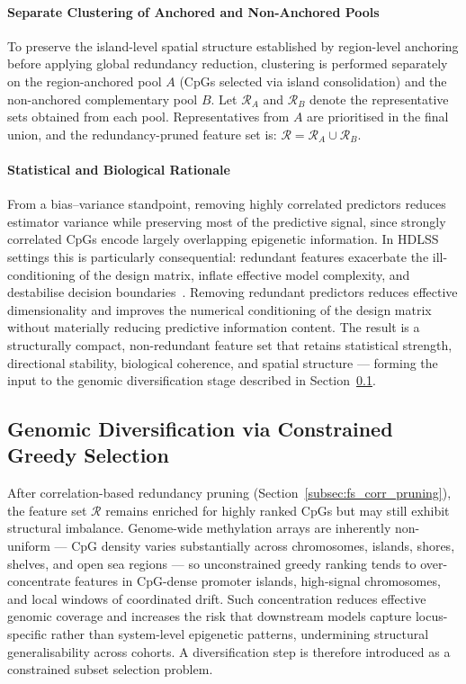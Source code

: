 \paragraph{Separate Clustering of Anchored and Non-Anchored Pools}

To preserve the island-level spatial structure established 
by region-level anchoring before applying global redundancy 
reduction, clustering is performed separately on the 
region-anchored pool $A$ (CpGs selected via island 
consolidation) and the non-anchored complementary pool 
$B$. Let $\mathcal{R}_A$ and $\mathcal{R}_B$ denote the 
representative sets obtained from each pool. Representatives 
from $A$ are prioritised in the final union, and the 
redundancy-pruned feature set is:
\(
\mathcal{R}
=
\mathcal{R}_A
\cup
\mathcal{R}_B.
\)

\paragraph{Statistical and Biological Rationale}

From a bias--variance standpoint, removing highly 
correlated predictors reduces estimator variance while 
preserving most of the predictive signal, since strongly 
correlated CpGs encode largely overlapping epigenetic 
information. In HDLSS settings this is particularly 
consequential: redundant features exacerbate the 
ill-conditioning of the design matrix, inflate effective 
model complexity, and destabilise decision 
boundaries~\cite{Donoho2000}. Removing redundant predictors reduces effective dimensionality 
and improves the numerical conditioning of the design matrix 
without materially reducing predictive information content.
The result is a structurally compact, non-redundant 
feature set that retains statistical strength, directional 
stability, biological coherence, and spatial structure — 
forming the input to the genomic diversification stage 
described in Section~\ref{subsec:fs_diversification}.

\subsection{Genomic Diversification via Constrained Greedy Selection}
\label{subsec:fs_diversification}

After correlation-based redundancy pruning
(Section~\ref{subsec:fs_corr_pruning}), the feature set
$\mathcal{R}$ remains enriched for highly ranked CpGs but
may still exhibit structural imbalance. Genome-wide methylation
arrays are inherently non-uniform — CpG density varies
substantially across chromosomes, islands, shores, shelves, and
open sea regions — so unconstrained greedy ranking tends to
over-concentrate features in CpG-dense promoter islands,
high-signal chromosomes, and local windows of coordinated drift.
Such concentration reduces effective genomic coverage and
increases the risk that downstream models capture locus-specific
rather than system-level epigenetic patterns, undermining
structural generalisability across cohorts. A diversification
step is therefore introduced as a constrained subset selection
problem.

